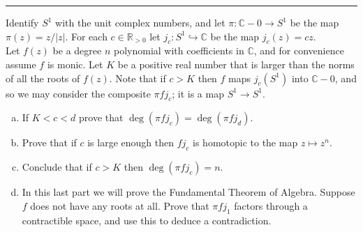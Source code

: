 \documentclass[a4paper, 12pt]{article}
\begin{document}
\noindent\rule{7in}{2.8pt}
\begin{problem}{7}
Identify \(S^1\) with the unit complex numbers, and let \(\pi:\mathbb{C}-0\rightarrow S^1\) be the map \(\pi(z)=z/|z|\). For each \(c\in \mathbb{R}_{>0}\) let \(j_c:S^1\hookrightarrow \mathbb{C}\) be the map \(j_c(z)=cz\).\\ 
Let \(f(z)\) be a degree \(n\) polynomial with coefficients in \(\mathbb{C}\), and for convenience assume \(f\) is monic. Let \(K\) be a positive real number that is larger than the norms of all the roots of \(f(z)\). 
Note that if \(c>K\) then \(f\) maps \(j_c(S^1)\) into \(\mathbb{C}-0\), and so we may consider the composite \(\pi fj_c\); it is a map \(S^1\rightarrow S^1\). 
\begin{enumerate}[(a)]
\item If \(K<c<d\) prove that \(\deg (\pi fj_c)=\deg (\pi fj_d)\). 
\item Prove that if \(c\) is large enough then \(fj_c\) is homotopic to the map \(z\mapsto z^n\).
\item Conclude that if \(c>K\) then \(\deg (\pi fj_c)=n\).
\item In this last part we will prove the Fundamental Theorem of Algebra. Suppose \(f\) does not have any roots at all. Prove that \(\pi fj_1\) factors through a contractible space, and use this to deduce a contradiction. 
\end{enumerate}
\end{problem}
\end{document}
